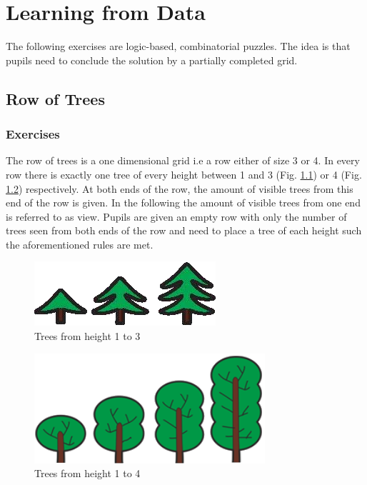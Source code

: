 \chapter{Learning from Data}
\label{chapter:learningFromData}

The following exercises are logic-based, combinatorial puzzles. The idea is that pupils need to conclude the solution by a partially completed grid.

\section{Row of Trees}
\label{section:treeRow}

\subsection{Exercises}
The row of trees is a one dimensional grid i.e a row either of size 3 or 4. In every row there is exactly one tree of every height between 1 and 3 (Fig. \ref{fig:trees_3}) or 4 (Fig. \ref{fig:trees_4}) respectively. At both ends of the row, the amount of visible trees from this end of the row is given. In the following the amount of visible trees from one end is referred to as view.
Pupils are given an empty row with only the number of trees seen from both ends of the row and need to place a tree of each height such the aforementioned rules are met.

\begin{figure} 
    \centering
    \includegraphics[width=0.4 \columnwidth]{figures/trees_3.png}
    \caption{Trees from height 1 to 3} 
    \label{fig:trees_3} 
\end{figure}

\begin{figure} 
    \centering
    \includegraphics[width=0.4 \columnwidth]{figures/trees_4.png}
    \caption{Trees from height 1 to 4} 
    \label{fig:trees_4} 
\end{figure}

